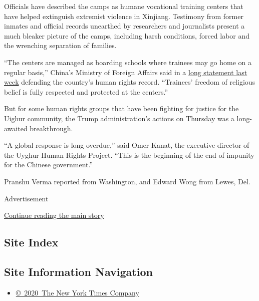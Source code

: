 Officials have described the camps as humane vocational training centers
that have helped extinguish extremist violence in Xinjiang. Testimony
from former inmates and official records unearthed by researchers and
journalists present a much bleaker picture of the camps, including harsh
conditions, forced labor and the wrenching separation of families.

``The centers are managed as boarding schools where trainees may go home
on a regular basis,'' China's Ministry of Foreign Affairs said in a
\href{https://www.fmprc.gov.cn/mfa_eng/zxxx_662805/t1794581.shtml}{long
statement last week} defending the country's human rights record.
``Trainees' freedom of religious belief is fully respected and protected
at the centers.''

But for some human rights groups that have been fighting for justice for
the Uighur community, the Trump administration's actions on Thursday was
a long-awaited breakthrough.

``A global response is long overdue,'' said Omer Kanat, the executive
director of the Uyghur Human Rights Project. ``This is the beginning of
the end of impunity for the Chinese government.''

Pranshu Verma reported from Washington, and Edward Wong from Lewes, Del.

Advertisement

\protect\hyperlink{after-bottom}{Continue reading the main story}

\hypertarget{site-index}{%
\subsection{Site Index}\label{site-index}}

\hypertarget{site-information-navigation}{%
\subsection{Site Information
Navigation}\label{site-information-navigation}}

\begin{itemize}
\tightlist
\item
  \href{https://help.nytimes.com/hc/en-us/articles/115014792127-Copyright-notice}{©~2020~The
  New York Times Company}
\end{itemize}

